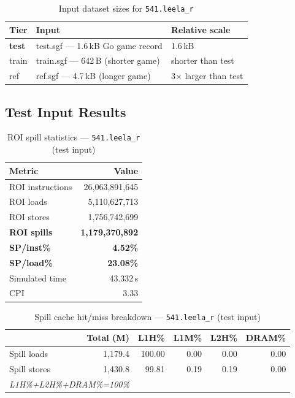 \documentclass[11pt,a4paper]{article}
\begin{document}
\begin{table}[H]
\centering
\caption{Input dataset sizes for \texttt{541.leela\_r}}
\label{tab:leela_inputs}
\small
\begin{tabular}{lp{8cm}l}
\toprule
\textbf{Tier} & \textbf{Input} & \textbf{Relative scale} \\
\midrule
\textbf{test} & test.sgf --- 1.6\,kB Go game record & 1.6\,kB \\
train & train.sgf --- 642\,B (shorter game) & shorter than test \\
ref & ref.sgf --- 4.7\,kB (longer game) & 3$\times$ larger than test \\
\bottomrule
\end{tabular}
\end{table}

\subsection{Test Input Results}

\begin{table}[H]
\centering
\caption{ROI spill statistics --- \texttt{541.leela\_r} (test input)}
\label{tab:leela_test_roi}
\begin{tabular}{lr}
\toprule
\textbf{Metric} & \textbf{Value} \\
\midrule
ROI instructions & 26,063,891,645 \\
ROI loads        & 5,110,627,713 \\
ROI stores       & 1,756,742,699 \\
\textbf{ROI spills}   & \textbf{1,179,370,892} \\
\textbf{SP/inst\%}   & \textbf{4.52\%} \\
\textbf{SP/load\%}   & \textbf{23.08\%} \\
Simulated time   & 43.332\,s \\
CPI              & 3.33 \\
\bottomrule
\end{tabular}
\end{table}

\begin{table}[H]
\centering
\caption{Spill cache hit/miss breakdown --- \texttt{541.leela\_r} (test input)}
\label{tab:leela_test_cache}
\begin{tabular}{lrrrrr}
\toprule
\textbf{} & \textbf{Total (M)} & \textbf{L1H\%} & \textbf{L1M\%} & \textbf{L2H\%} & \textbf{DRAM\%} \\
\midrule
Spill loads  & 1,179.4 & 100.00 & 0.00 & 0.00 & 0.00 \\
Spill stores & 1,430.8 & 99.81 & 0.19 & 0.19 & 0.00 \\
\multicolumn{2}{l}{\small\textit{L1H\%+L2H\%+DRAM\%=100\%}} \\
\bottomrule
\end{tabular}
\end{table}
\end{document}
